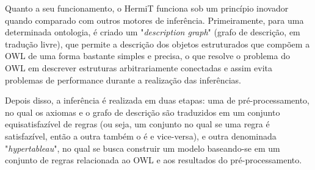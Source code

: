 \documentclass{article}
\begin{document}
        Quanto a seu funcionamento, o HermiT funciona sob um princípio inovador
        quando comparado com outros motores de inferência. Primeiramente, para
        uma determinada ontologia, é criado um "\textit{description graph}"
        (grafo de descrição, em tradução livre), que permite a descrição dos
        objetos estruturados que compõem a OWL de uma forma bastante simples e
        precisa, o que resolve o problema do OWL em descrever estruturas
        arbitrariamente conectadas e assim evita problemas de performance
        durante a realização das inferências. 
        
        Depois disso, a inferência é realizada em duas etapas: uma de
        pré-processamento, no qual os axiomas e o grafo de descrição são
        traduzidos em um conjunto equisatisfazível de regras (ou seja, um
        conjunto no qual se uma regra é satisfazível, então a outra também o é
        e vice-versa), e outra denominada "\textit{hypertableau}", no qual se
        busca construir um modelo baseando-se em um conjunto de regras
        relacionada ao OWL e aos resultados do pré-processamento.

    \nocite{stackoverflow, hermit, mgs08structured-objects}

    
\end{document}
